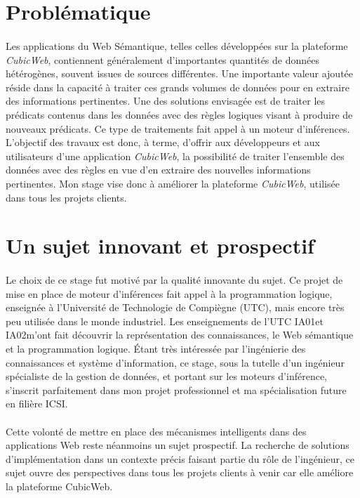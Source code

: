 \documentclass {report}
\begin{document}
\section{Problématique}
\paragraph{}
Les applications du Web Sémantique, telles celles développées sur la plateforme \textit{CubicWeb}, contiennent généralement d'importantes quantités de données hétérogènes, souvent issues de sources différentes. Une importante valeur ajoutée réside dans la capacité à traiter ces grands volumes de données pour en extraire des informations pertinentes. Une des solutions envisagée est de traiter les prédicats contenus dans les données avec des règles logiques visant à produire de nouveaux prédicats. Ce type de traitements fait appel à un moteur d'inférences. L'objectif des travaux est donc, à terme, d'offrir aux développeurs et aux utilisateurs d'une application \textit{CubicWeb}, la possibilité de traiter l'ensemble des données avec des règles en vue d'en extraire des nouvelles informations pertinentes. Mon stage vise donc à améliorer la plateforme \textit{CubicWeb}, utilisée dans tous les projets clients.


\section{Un sujet innovant et prospectif}
\paragraph{}
Le choix de ce stage fut motivé par la qualité innovante du sujet. Ce projet de mise en place de moteur d'inférences fait appel à la programmation logique, enseignée à l'Université de Technologie de Compiègne (UTC), mais encore très peu utilisée dans le monde industriel. Les enseignements de l'UTC IA01\footnotemark[1] et IA02\footnotemark[2] m'ont fait découvrir la  représentation des connaissances, le Web sémantique et la programmation logique. Étant très intéressée par l'ingénierie des connaissances et système d'information, ce stage, sous la tutelle d'un ingénieur spécialiste de la gestion de données, et portant sur les moteurs d'inférence, s'inscrit parfaitement dans mon projet professionnel et ma spécialisation future en filière ICSI.
\paragraph{}
Cette volonté de mettre en place des mécanismes intelligents dans des applications Web reste néanmoins un sujet prospectif. La recherche de solutions d'implémentation dans un contexte précis faisant partie du rôle de l'ingénieur, ce sujet ouvre des perspectives dans tous les projets clients à venir car elle améliore la plateforme CubicWeb.
\end{document}
